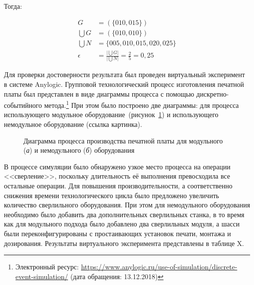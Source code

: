 \noindent Тогда:

\begin{equation}
\begin{split}
	G &= (\{010, 015\}) \\
	\bigcup G &= (\{010, 010\}) \\
	\bigcup N &= \{005, 010, 015, 020, 025\} \\
	\epsilon &= \frac{\big|\bigcup G \big|}{\big|\bigcup N \big|} = \frac{2}{5} = 0,25
	\end{split}
\end{equation}

Для проверки достоверности результата был проведен виртуальный эксперимент в системе Anylogic. Групповой технологический процесс изготовления печатной платы был представлен в виде диаграммы процесса с помощью дискретно-событийного метода.\footnote{Электронный ресурс: \url{https://www.anylogic.ru/use-of-simulation/discrete-event-simulation/} (дата обращения: 13.12.2018)} При этом было построено две диаграммы: для процесса использующего модульное оборудование~(рисунок~\cref{fig:oee-module}) и использующего немодульное оборудование (ссылка картинка).

\begin{figure}[!p]
	\caption[Диаграмма процесса производства печатной платы для модульного и немодульного оборудования]%
	{Диаграмма процесса производства печатной платы для модульного (\textit{а}) и немодульного (\textit{б}) оборудования}\label{fig:oee-module}
\end{figure}

В процессе симуляции было обнаружено узкое место процесса на операции <<сверление>>, поскольку длительность её выполнения превосходила все остальные операции. Для повышения производительности, а соответственно снижения времени технологического цикла было предложено увеличить количество сверлильного оборудования. При этом для немодульного оборудования необходимо было добавить два дополнительных сверлильных станка, в то время как для модульного подхода было добавлено два сверлильных модуля, а шасси были переконфигурированы с простаивающих установок печати, монтажа и дозирования. Результаты виртуального эксперимента представлены в таблице X.


